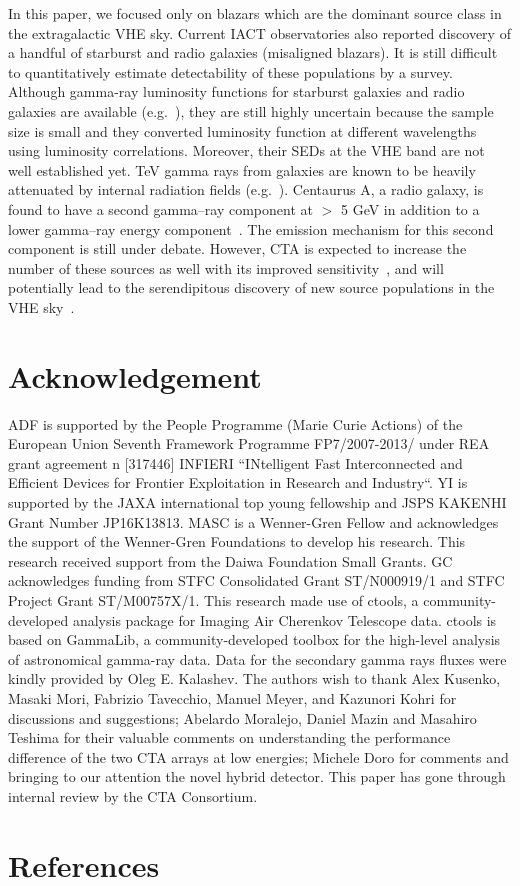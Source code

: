 \documentclass[final,5p]{elsarticle}
\begin{document}
In this paper, we focused only on blazars which are the dominant source class in the extragalactic VHE sky. Current IACT observatories also reported discovery of a handful of starburst and radio galaxies (misaligned blazars). It is still difficult to quantitatively estimate detectability of these populations by a survey. Although gamma-ray luminosity functions for starburst galaxies and radio galaxies are available (e.g.~\cite{AckermannAjello2012,InoueRadioGalaxies}), they are still highly uncertain because the sample size is small and they converted luminosity function at different wavelengths using luminosity correlations. Moreover, their SEDs at the VHE band are not well established yet. TeV gamma rays from galaxies are known to be heavily attenuated by internal radiation fields (e.g.~\cite{InoueStarburst}). Centaurus A, a radio galaxy, is found to have a second gamma--ray component at $>$ 5 GeV in addition to a lower gamma--ray energy component~\cite{Sahakyan2013,Brown2016}. The emission mechanism for this second component is still under debate. However, CTA is expected to increase the number of these sources as well with its improved sensitivity~\cite{Acero2013b, Sol2013}, and will potentially lead to the serendipitous discovery of new source populations in the VHE sky~\cite{CRAcc1,CRAcc2,CRAcc3,CRAcc4}.

\section*{Acknowledgement }
ADF is supported by the People Programme (Marie Curie Actions) of the European Union Seventh Framework Programme FP7/2007-2013/ under REA grant agreement n [317446] INFIERI “INtelligent Fast Interconnected and Efficient Devices for Frontier Exploitation in Research and Industry“. YI is supported by the JAXA international top young fellowship and JSPS KAKENHI Grant Number 
\break JP16K13813. MASC is a Wenner-Gren Fellow and acknowledges the support of the Wenner-Gren Foundations to develop his research. This research received support from the Daiwa Foundation Small Grants. GC acknowledges funding from STFC Consolidated Grant ST/N000919/1 and STFC Project Grant ST/M00757X/1. This research made use of ctools, a community-developed analysis package for Imaging Air Cherenkov Telescope data. ctools is based on GammaLib, a community-developed toolbox for the high-level analysis of astronomical gamma-ray data. Data for the secondary gamma rays fluxes were kindly provided by Oleg E. Kalashev. 
The authors wish to thank Alex Kusenko, Masaki Mori, Fabrizio Tavecchio, Manuel Meyer, and Kazunori Kohri for discussions and suggestions; Abelardo Moralejo, Daniel Mazin and Masahiro Teshima for their valuable comments on understanding the performance difference of the two CTA arrays at low energies; Michele Doro for comments and bringing to our attention the novel hybrid detector. This paper has gone through internal review by the CTA Consortium.


\section*{References}

\end{document}
